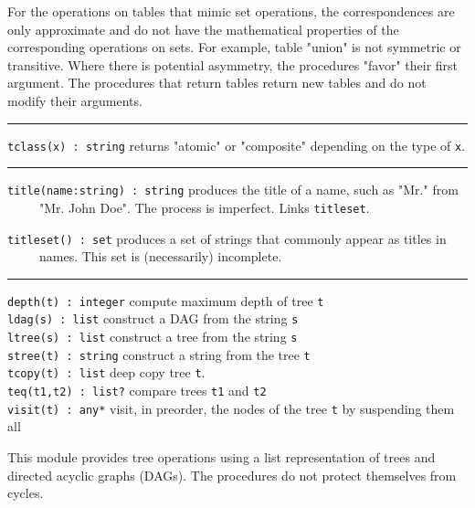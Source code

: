 For the operations on tables that mimic set operations, the
correspondences are only approximate and do not have the mathematical
properties of the corresponding operations on sets. For example, table
"union" is not symmetric or transitive.
Where there is potential asymmetry, the procedures
"favor" their first argument. The
procedures that return tables return new tables and do not modify their
arguments.

\vspace{0.25cm}\hrule{}

\texttt{tclass(x) : string} returns "atomic"
or "composite" depending on the type of
\texttt{x}. 

\vspace{0.25cm}\hrule{}

\texttt{title(name:string) : string} produces the title of a name, such
as "Mr." from\\
 \ \ \ \ \ "Mr. John Doe". The process is
imperfect. Links \texttt{titleset}.

\texttt{titleset() : set} produces a set of strings that commonly appear
as titles in\\
 \ \ \ \ \ names. This set is (necessarily) incomplete. 

\vspace{0.25cm}\hrule{}

\texttt{depth(t) : integer} compute maximum depth of tree
\texttt{t}\\
\texttt{ldag(s) : list} construct a DAG from the string
\texttt{s}\\
\texttt{ltree(s) : list} construct a tree from the string
\texttt{s}\\
\texttt{stree(t) : string} construct a string from the tree
\texttt{t}\\
\texttt{tcopy(t) : list} deep copy tree \texttt{t}.\\
\texttt{teq(t1,t2) : list?} compare trees \texttt{t1} and
\texttt{t2}\\
\texttt{visit(t) : any*} visit, in preorder, the nodes of the tree
\texttt{t} by suspending them all 

This module provides tree operations using a list representation of
trees and directed acyclic graphs (DAGs). The procedures do not
protect themselves from cycles. 

